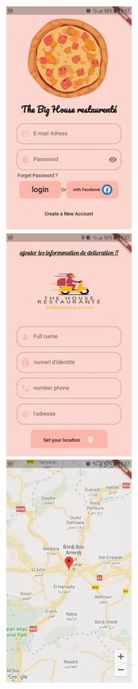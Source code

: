 \documentclass{article}
\begin{document}
\includegraphics[scale=1]{./out/MobileApp/Ui/5.png}\\
\includegraphics[scale=1]{./out/MobileApp/Ui/6.png}\\
\includegraphics[scale=1]{./out/MobileApp/Ui/7.png}\\
\end{document}
